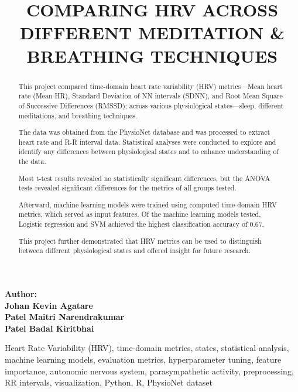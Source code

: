 \documentclass[
  11pt,
]{ieee}
\title{COMPARING HRV ACROSS DIFFERENT MEDITATION \& BREATHING
TECHNIQUES}
\author{}
\date{}
\begin{document}
\maketitle


\vspace{1cm}

\begin{center}
\large \textbf{Author:}\\[0.25em]
\textbf{Johan Kevin Agatare}\\
\textbf{Patel Maitri Narendrakumar}\\
\textbf{Patel Badal Kiritbhai}
\end{center}

\vspace{0.8cm}

\begin{abstract}

This project compared time-domain heart rate variability (HRV)  metrics—Mean heart rate (Mean-HR), Standard Deviation of NN intervals (SDNN), and Root Mean Square of Successive Differences (RMSSD); across various physiological states—sleep, different meditations, and breathing techniques. 

The data was obtained from the PhysioNet database and was processed to extract heart rate and R-R interval data. Statistical analyses were conducted to explore and identify any differences between physiological states and to enhance understanding of the data. 

Most t-test results revealed no statistically significant differences, but the ANOVA tests revealed significant differences for the metrics of all groups tested. 

Afterward, machine learning models were trained using computed time-domain HRV metrics, which served as input features. Of the machine learning models tested, Logistic regression and SVM achieved the highest classification accuracy of 0.67. 

This project further demonstrated that HRV metrics can be used to distinguish between different physiological states and offered insight for future research.

\end{abstract}
\renewcommand{\IEEEkeywordsname}{Keywords}
\begin{IEEEkeywords}
\scriptsize 
Heart Rate Variability (HRV), time-domain metrics, states, statistical analysis, machine learning models, evaluation metrics, hyperparameter tuning, feature importance, autonomic nervous system, parasympathetic activity, preprocessing, RR intervals, visualization, Python, R, PhysioNet dataset
\end{IEEEkeywords}
\end{document}
